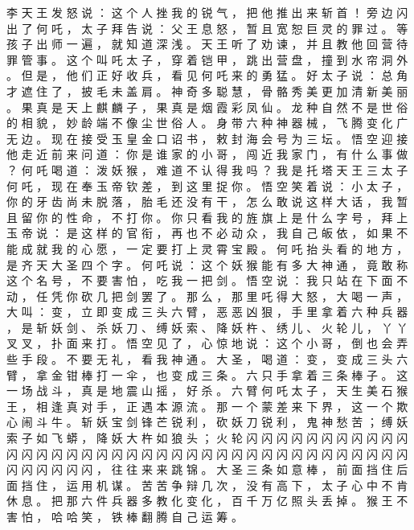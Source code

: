 {李 天 王 发 怒 说 ： 这 个 人 挫 我 的 锐 气 ， 把 他 推 出 来 斩 首 ！ 旁 边 闪 出 了 何 吒 ， 太 子 拜 告 说 ： 父 王 息 怒 ， 暂 且 宽 恕 巨 灵 的 罪 过 。
等 孩 子 出 师 一 遍 ， 就 知 道 深 浅 。
天 王 听 了 劝 谏 ， 并 且 教 他 回 营 待 罪 管 事 。
这 个 叫 吒 太 子 ， 穿 着 铠 甲 ， 跳 出 营 盘 ， 撞 到 水 帘 洞 外 。
但 是 ， 他 们 正 好 收 兵 ， 看 见 何 吒 来 的 勇 猛 。
好 太 子 说 ： 总 角 才 遮 住 了 ， 披 毛 未 盖 肩 。
神 奇 多 聪 慧 ， 骨 骼 秀 美 更 加 清 新 美 丽 。
果 真 是 天 上 麒 麟 子 ， 果 真 是 烟 霞 彩 凤 仙 。
龙 种 自 然 不 是 世 俗 的 相 貌 ， 妙 龄 端 不 像 尘 世 俗 人 。
身 带 六 种 神 器 械 ， 飞 腾 变 化 广 无 边 。
现 在 接 受 玉 皇 金 口 诏 书 ， 敕 封 海 会 号 为 三 坛 。
悟 空 迎 接 他 走 近 前 来 问 道 ： 你 是 谁 家 的 小 哥 ， 闯 近 我 家 门 ， 有 什 么 事 做 ？ 何 吒 喝 道 ： 泼 妖 猴 ， 难 道 不 认 得 我 吗 ？ 我 是 托 塔 天 王 三 太 子 何 吒 ， 现 在 奉 玉 帝 钦 差 ， 到 这 里 捉 你 。
悟 空 笑 着 说 ： 小 太 子 ， 你 的 牙 齿 尚 未 脱 落 ， 胎 毛 还 没 有 干 ， 怎 么 敢 说 这 样 大 话 ， 我 暂 且 留 你 的 性 命 ， 不 打 你 。
你 只 看 我 的 旌 旗 上 是 什 么 字 号 ， 拜 上 玉 帝 说 ： 是 这 样 的 官 衔 ， 再 也 不 必 动 众 ， 我 自 己 皈 依 ， 如 果 不 能 成 就 我 的 心 愿 ， 一 定 要 打 上 灵 霄 宝 殿 。
何 吒 抬 头 看 的 地 方 ， 是 齐 天 大 圣 四 个 字 。
何 吒 说 ： 这 个 妖 猴 能 有 多 大 神 通 ， 竟 敢 称 这 个 名 号 ， 不 要 害 怕 ， 吃 我 一 把 剑 。
悟 空 说 ： 我 只 站 在 下 面 不 动 ， 任 凭 你 砍 几 把 剑 罢 了 。
那 么 ， 那 里 吒 得 大 怒 ， 大 喝 一 声 ， 大 叫 ： 变 ， 立 即 变 成 三 头 六 臂 ， 恶 恶 凶 狠 ， 手 里 拿 着 六 种 兵 器 ， 是 斩 妖 剑 、 杀 妖 刀 、 缚 妖 索 、 降 妖 杵 、 绣 儿 、 火 轮 儿 ， 丫 丫 叉 叉 ， 扑 面 来 打 。
悟 空 见 了 ， 心 惊 地 说 ： 这 个 小 哥 ， 倒 也 会 弄 些 手 段 。
不 要 无 礼 ， 看 我 神 通 。
大 圣 ， 喝 道 ： 变 ， 变 成 三 头 六 臂 ， 拿 金 钳 棒 打 一 伞 ， 也 变 成 三 条 。
六 只 手 拿 着 三 条 棒 子 。
这 一 场 战 斗 ， 真 是 地 震 山 摇 ， 好 杀 。 六 臂 何 吒 太 子 ， 天 生 美 石 猴 王 ， 相 逢 真 对 手 ， 正 遇 本 源 流 。
那 一 个 蒙 差 来 下 界 ， 这 一 个 欺 心 闹 斗 牛 。
斩 妖 宝 剑 锋 芒 锐 利 ， 砍 妖 刀 锐 利 ， 鬼 神 愁 苦 ； 缚 妖 索 子 如 飞 蟒 ， 降 妖 大 杵 如 狼 头 ； 火 轮 闪 闪 闪 闪 闪 闪 闪 闪 闪 闪 闪 闪 闪 闪 闪 闪 闪 闪 闪 闪 闪 闪 闪 闪 闪 闪 闪 闪 闪 闪 闪 闪 闪 闪 闪 闪 闪 闪 闪 闪 闪 闪 闪 闪 ， 往 往 来 来 跳 锦 。
大 圣 三 条 如 意 棒 ， 前 面 挡 住 后 面 挡 住 ， 运 用 机 谋 。
苦 苦 争 辩 几 次 ， 没 有 高 下 ， 太 子 心 中 不 肯 休 息 。
把 那 六 件 兵 器 多 教 化 变 化 ， 百 千 万 亿 照 头 丢 掉 。
猴 王 不 害 怕 ， 哈 哈 笑 ， 铁 棒 翻 腾 自 己 运 筹 。
}

